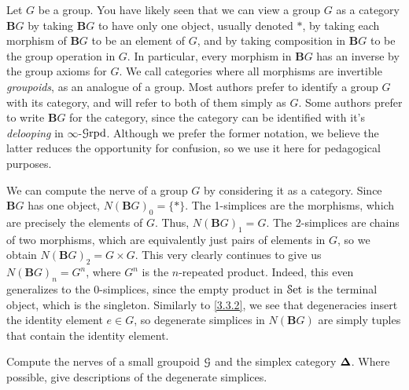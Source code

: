 \begin{example}\label{3.3.3}
    Let $G$ be a group. You have likely seen that we can view a group $G$ as a category $\mathbf{B}G$ by taking $\mathbf{B}G$ to have only one object, usually denoted $*$, by taking each morphism of $\mathbf{B}G$ to be an element of $G$, and by taking composition in $\mathbf{B}G$ to be the group operation in $G$. In particular, every morphism in $\mathbf{B}G$ has an inverse by the group axioms for $G$. We call categories where all morphisms are invertible \emph{groupoids}, as an analogue of a group. Most authors prefer to identify a group $G$ with its category, and will refer to both of them simply as $G$. Some authors prefer to write $\mathbf{B}G$ for the category, since the category can be identified with it's \emph{delooping} in $\infty$-$\mathcal{G}\mathrm{rpd}$. Although we prefer the former notation, we believe the latter reduces the opportunity for confusion, so we use it here for pedagogical purposes.

    We can compute the nerve of a group $G$ by considering it as a category. Since $\mathbf{B}G$ has one object, $N(\mathbf{B}G)_0=\{*\}$. The 1-simplices are the morphisms, which are precisely the elements of $G$. Thus, $N(\mathbf{B}G)_1=G$. The 2-simplices are chains of two morphisms, which are equivalently just pairs of elements in $G$, so we obtain $N(\mathbf{B}G)_2=G\times G$. This very clearly continues to give us $N(\mathbf{B}G)_n=G^n$, where $G^n$ is the $n$-repeated product. Indeed, this even generalizes to the $0$-simplices, since the empty product in $\mathcal{S}\mathrm{et}$ is the terminal object, which is the singleton. Similarly to \cref{3.3.2}, we see that degeneracies insert the identity element $e\in G$, so degenerate simplices in $N(\mathbf{B}G)$ are simply tuples that contain the identity element.
\end{example}

\begin{exercise}\label{3.3.4}
    Compute the nerves of a small groupoid $\mathcal{G}$ and the simplex category $\boldsymbol{\Delta}$. Where possible, give descriptions of the degenerate simplices.
\end{exercise}


